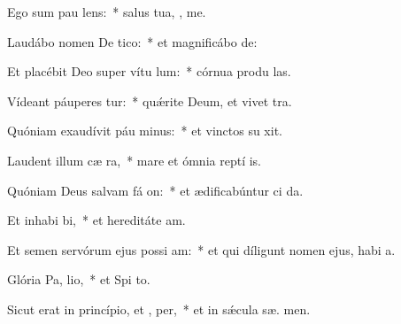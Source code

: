 \item Ego sum pau  lens:~* salus tua, ,  me.
\item Laudábo nomen De  tico:~* et magnificábo   de:
\item Et placébit Deo super vítu lum:~* córnua produ  las.
\item Vídeant páuperes  tur:~* quǽrite Deum, et vivet  tra.
\item Quóniam exaudívit páu minus:~* et vinctos su  xit.
\item Laudent illum cæ  ra,~* mare et ómnia reptí  is.
\item Quóniam Deus salvam fá on:~* et ædificabúntur ci da.
\item Et inhabi bi,~* et hereditáte  am.
\item Et semen servórum ejus possi am:~* et qui díligunt nomen ejus, habi  a.
\item Glória Pa,  lio,~* et Spi to.
\item Sicut erat in princípio, et ,  per,~* et in sǽcula sæ. men.
